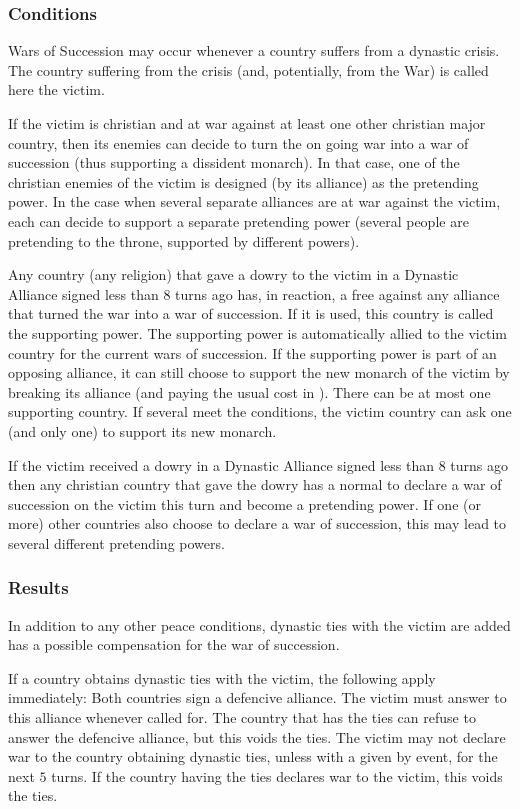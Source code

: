 \subsubsection{Conditions}
\aparag Wars of Succession may occur whenever a country suffers from a
dynastic crisis. The country suffering from the crisis (and, potentially, from
the War) is called here the victim.

\aparag If the victim is christian and at war against at least one other
christian major country, then its enemies can decide to turn the on going war
into a war of succession (thus supporting a dissident monarch).
\bparag In that case, one of the christian enemies of the victim is designed
(by its alliance) as the pretending power.
\bparag In the case when several separate alliances are at war against the
victim, each can decide to support a separate pretending power (several people
are pretending to the throne, supported by different powers).

\aparag Any country (any religion) that gave a dowry to the victim in a
Dynastic Alliance signed less than 8 turns ago has, in reaction, a free \CB
against any alliance that turned the war into a war of succession. If it is
used, this country is called the supporting power.
\bparag The supporting power is automatically allied to the victim country for
the current wars of succession.
\bparag If the supporting power is part of an opposing alliance, it can still
choose to support the new monarch of the victim by breaking its alliance (and
paying the usual cost in \STAB).
\bparag There can be at most one supporting country. If several meet the
conditions, the victim country can ask one (and only one) to support its new
monarch.

\aparag If the victim received a dowry in a Dynastic Alliance signed less than
8 turns ago then any christian country that gave the dowry has a normal \CB to
declare a war of succession on the victim this turn and become a pretending
power.
\bparag If one (or more) other countries also choose to declare a war of
succession, this may lead to several different pretending powers.


\subsubsection{Results}
\aparag In addition to any other peace conditions, dynastic ties with the
victim are added has a possible compensation for the war of succession.

 If a country obtains dynastic ties with the victim, the
following apply immediately:
\bparag Both countries sign a defencive alliance. The victim must answer to
this alliance whenever called for. The country that has the ties can refuse to
answer the defencive alliance, but this voids the ties.
\bparag The victim may not declare war to the country obtaining dynastic ties,
unless with a \CB given by event, for the next $5$ turns.
\bparag If the country having the ties declares war to the victim, this voids
the ties.

